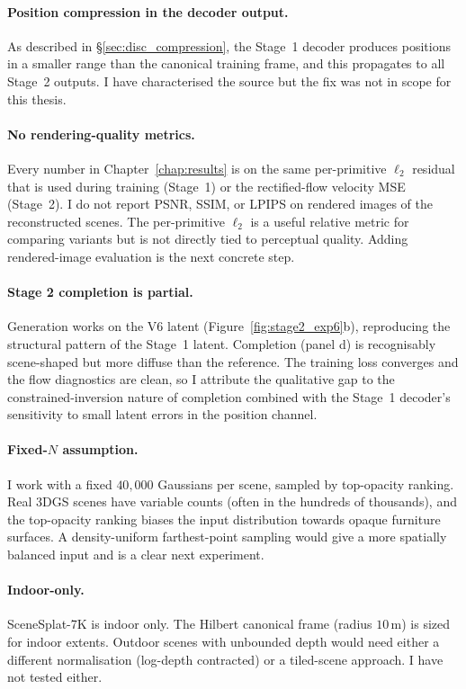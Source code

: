 \paragraph{Position compression in the decoder output.} As described in \S\ref{sec:disc_compression}, the Stage~1 decoder produces positions in a smaller range than the canonical training frame, and this propagates to all Stage~2 outputs. I have characterised the source but the fix was not in scope for this thesis.

\paragraph{No rendering-quality metrics.} Every number in Chapter~\ref{chap:results} is on the same per-primitive $\ell_2$ residual that is used during training (Stage~1) or the rectified-flow velocity MSE (Stage~2). I do not report PSNR, SSIM, or LPIPS on rendered images of the reconstructed scenes. The per-primitive $\ell_2$ is a useful relative metric for comparing variants but is not directly tied to perceptual quality. Adding rendered-image evaluation is the next concrete step.

\paragraph{Stage 2 completion is partial.} Generation works on the V6 latent (Figure~\ref{fig:stage2_exp6}b), reproducing the structural pattern of the Stage~1 latent. Completion (panel d) is recognisably scene-shaped but more diffuse than the reference. The training loss converges and the flow diagnostics are clean, so I attribute the qualitative gap to the constrained-inversion nature of completion combined with the Stage~1 decoder's sensitivity to small latent errors in the position channel.

\paragraph{Fixed-$N$ assumption.} I work with a fixed $40{,}000$ Gaussians per scene, sampled by top-opacity ranking. Real 3DGS scenes have variable counts (often in the hundreds of thousands), and the top-opacity ranking biases the input distribution towards opaque furniture surfaces. A density-uniform farthest-point sampling would give a more spatially balanced input and is a clear next experiment.

\paragraph{Indoor-only.} SceneSplat-7K is indoor only. The Hilbert canonical frame (radius $10$\,m) is sized for indoor extents. Outdoor scenes with unbounded depth would need either a different normalisation (log-depth contracted) or a tiled-scene approach. I have not tested either.

